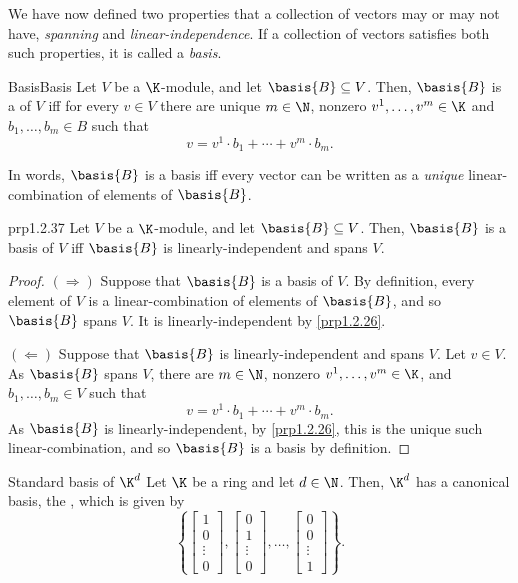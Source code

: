We have now defined two properties that a collection of vectors may or may not have, \emph{spanning} and \emph{linear-independence}.  If a collection of vectors satisfies both such properties, it is called a \emph{basis}.
\begin{dfn}{Basis}{Basis}
	Let $V$ be a $\K$-module, and let $\basis{B}\subseteq V$.  Then, $\basis{B}$ is a  of $V$ iff for every $v\in V$ there are unique $m\in \N$, nonzero $v^1,\ldots ,v^m\in \K$ and $b_1,\ldots ,b_m\in B$ such that
	\begin{equation}
		v=v^1\cdot b_1+\cdots +v^m\cdot b_m.
	\end{equation}
	\begin{rmk}
		In words, $\basis{B}$ is a basis iff every vector can be written as a \emph{unique} linear-combination of elements of $\basis{B}$.
	\end{rmk}
\end{dfn}
\begin{prp}{}{prp1.2.37}
	Let $V$ be a $\K$-module, and let $\basis{B}\subseteq V$.  Then, $\basis{B}$ is a basis of $V$ iff $\basis{B}$ is linearly-independent and spans $V$.
	\begin{proof}
		$(\Rightarrow )$ Suppose that $\basis{B}$ is a basis of $V$.  By definition, every element of $V$ is a linear-combination of elements of $\basis{B}$, and so $\basis{B}$ spans $V$.  It is linearly-independent by \cref{prp1.2.26}.
		
		\blni
		$(\Leftarrow )$ Suppose that $\basis{B}$ is linearly-independent and spans $V$.  Let $v\in V$.  As $\basis{B}$ spans $V$, there are $m\in \N$, nonzero $v^1,\ldots ,v^m\in \K$, and $b_1,\ldots ,b_m\in V$ such that
		\begin{equation}
			v=v^1\cdot b_1+\cdots +v^m\cdot b_m.
		\end{equation}
		As $\basis{B}$ is linearly-independent, by \cref{prp1.2.26}, this is the unique such linear-combination, and so $\basis{B}$ is a basis by definition.
	\end{proof}
\end{prp}
\begin{exm}{Standard basis of $\K ^d$}{}
	Let $\K$ be a ring and let $d\in \N$.  Then, $\K ^d$ has a canonical basis, the , which is given by
	\begin{equation}
		\left\{ \begin{bmatrix}1 \\ 0 \\ \vdots \\ 0\end{bmatrix},\begin{bmatrix}0 \\ 1 \\ \vdots \\ 0\end{bmatrix},\ldots ,\begin{bmatrix}0 \\ 0 \\ \vdots \\ 1\end{bmatrix}\right\} .
	\end{equation}
\end{exm}

